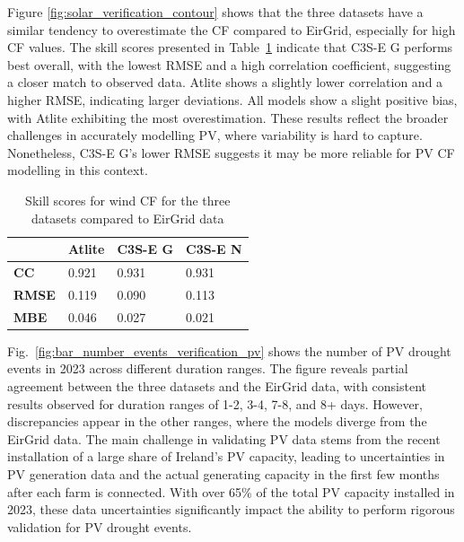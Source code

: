 \documentclass[a4paper, 11pt]{article}
\begin{document}
Figure \ref{fig:solar_verification_contour} shows that the three datasets have a similar tendency to overestimate the CF compared to EirGrid, especially for high CF values. The skill scores presented in Table~\ref{tab:pv_skill_scores} indicate that C3S-E G performs best overall, with the lowest RMSE and a high correlation coefficient, suggesting a closer match to observed data. Atlite shows a slightly lower correlation and a higher RMSE, indicating larger deviations. All models show a slight positive bias, with Atlite exhibiting the most overestimation. These results reflect the broader challenges in accurately modelling PV, where variability is hard to capture. Nonetheless, C3S-E G’s lower RMSE suggests it may be more reliable for PV CF modelling in this context.

\begin{table}[!ht]
	\centering
	\begin{tabular}{l|lll|}
	\cline{2-4}
	& \textbf{Atlite} & \textbf{C3S-E G} & \textbf{C3S-E N} \\ \hline
	\multicolumn{1}{|l|}{\textbf{CC}}   & 0.921           & 0.931            & 0.931            \\ \hline
	\multicolumn{1}{|l|}{\textbf{RMSE}} & 0.119           & 0.090            & 0.113            \\ \hline
	\multicolumn{1}{|l|}{\textbf{MBE}}   & 0.046           & 0.027           & 0.021           \\ \hline
	\end{tabular}
	\caption{Skill scores for wind CF for the three datasets compared to EirGrid data}
	\label{tab:pv_skill_scores}
\end{table}

Fig.~\ref{fig:bar_number_events_verification_pv} shows the number of PV drought events in 2023 across different duration ranges. The figure reveals partial agreement between the three datasets and the EirGrid data, with consistent results observed for duration ranges of 1-2, 3-4, 7-8, and 8+ days. However, discrepancies appear in the other ranges, where the models diverge from the EirGrid data. The main challenge in validating PV data stems from the recent installation of a large share of Ireland’s PV capacity, leading to uncertainties in PV generation data and the actual generating capacity in the first few months after each farm is connected. With over 65\% of the total PV capacity installed in 2023, these data uncertainties significantly impact the ability to perform rigorous validation for PV drought events.
\end{document}
